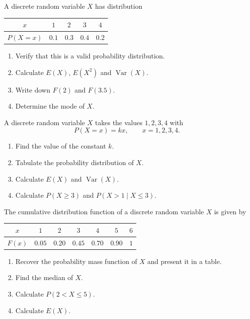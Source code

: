 \documentclass[11pt]{article}
\newcounter{popsec}
\newcounter{popsub}
\newcommand{\courssub}[1]{%
  \stepcounter{popsub}%
  \par\vspace{9pt}\noindent{\popxbold\fontsize{11.5}{13}\selectfont\color{popink}{\color{poporange}\thepopsec.\thepopsub}\hspace{6pt}#1}\par\nopagebreak\vspace{4pt}
}
\begin{document}
\begin{exercice}
A discrete random variable $X$ has distribution
\begin{center}
\begin{tabular}{|c|c|c|c|c|}
\hline
\rowcolor{popblueL} $x$ & $1$ & $2$ & $3$ & $4$ \\
\hline
$P(X = x)$ & $0.1$ & $0.3$ & $0.4$ & $0.2$ \\
\hline
\end{tabular}
\end{center}
\begin{enumerate}
\item Verify that this is a valid probability distribution.
\item Calculate $E(X)$, $E(X^2)$ and $\operatorname{Var}(X)$.
\item Write down $F(2)$ and $F(3.5)$.
\item Determine the mode of $X$.
\end{enumerate}
\end{exercice}

\courssub{I practise}

\begin{exercice}
A discrete random variable $X$ takes the values $1, 2, 3, 4$ with
\[ P(X = x) = kx, \qquad x = 1, 2, 3, 4. \]
\begin{enumerate}
\item Find the value of the constant $k$.
\item Tabulate the probability distribution of $X$.
\item Calculate $E(X)$ and $\operatorname{Var}(X)$.
\item Calculate $P(X \geq 3)$ and $P(X > 1 \mid X \leq 3)$.
\end{enumerate}
\end{exercice}

\begin{exercice}
The cumulative distribution function of a discrete random variable $X$ is given by
\begin{center}
\begin{tabular}{|c|c|c|c|c|c|c|}
\hline
\rowcolor{popblueL} $x$ & $1$ & $2$ & $3$ & $4$ & $5$ & $6$ \\
\hline
$F(x)$ & $0.05$ & $0.20$ & $0.45$ & $0.70$ & $0.90$ & $1$ \\
\hline
\end{tabular}
\end{center}
\begin{enumerate}
\item Recover the probability mass function of $X$ and present it in a table.
\item Find the median of $X$.
\item Calculate $P(2 < X \leq 5)$.
\item Calculate $E(X)$.
\end{enumerate}
\end{exercice}
\end{document}
